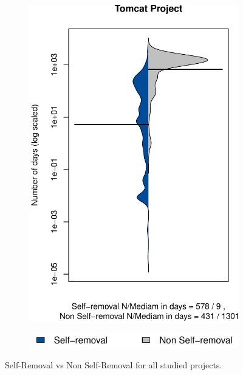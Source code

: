 \begin{figure}[t]
\begin{subfigure}[b]{0.195\textwidth}
		\includegraphics[width=\textwidth]{figures/test/Tomcat.pdf}
		\label{fig:removal_comparison_tomcat} 
	\end{subfigure}
	\begin{subfigure}[b]{0.30\textwidth}
		\includegraphics[width=\textwidth]{figures/test/legend_.pdf}
	\end{subfigure}
	\caption{Self-Removal vs Non Self-Removal for all studied projects.}
	\label{fig:removal_self_vs_nonself}
\end{figure}










